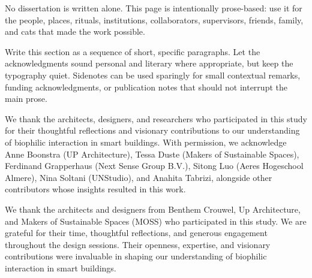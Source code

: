 \cleardoublepage
{}

No dissertation is written alone. This page is intentionally prose-based: use it for the people, places, rituals, institutions, collaborators, supervisors, friends, family, and cats that made the work possible.

Write this section as a sequence of short, specific paragraphs. Let the acknowledgments sound personal and literary where appropriate, but keep the typography quiet. Sidenotes can be used sparingly for small contextual remarks, funding acknowledgments, or publication notes that should not interrupt the main prose.

We thank the architects, designers, and researchers who participated in this study for their thoughtful reflections and visionary contributions to our understanding of biophilic interaction in smart buildings.
With permission, we acknowledge Anne Boonstra (UP Architecture), Tessa Duste (Makers of Sustainable Spaces), Ferdinand Grapperhaus (Next Sense Group B.V.), Sitong Luo (Aeres Hogeschool Almere), Nina Soltani (UNStudio), and Anahita Tabrizi, alongside other contributors whose insights resulted in this work.

We thank the architects and designers from Benthem Crouwel, Up Architecture, and Makers of Sustainable Spaces (MOSS) who participated in this study. We are grateful for their time, thoughtful reflections, and generous engagement throughout the design sessions. Their openness, expertise, and visionary contributions were invaluable in shaping our understanding of biophilic interaction in smart buildings.

\vspace{2.0em}
\noindent\thesisauthor\par
\noindent\thesiscity\par
\noindent\thesisdate
